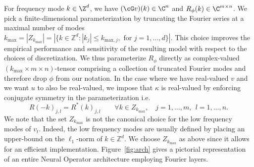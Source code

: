 For frequency mode \(k \in \Z^d\), we have $(\cG v)(k) \in \C^{n}$ and $R_\phi(k) \in \C^{m \times n}$. We pick a finite-dimensional parameterization by truncating the Fourier series at a maximal number of modes 
\(k_{\text{max}} = |Z_{k_{\text{max}}}| = |\{k \in \mathbb{Z}^d : |k_j| \leq k_{\text{max},j}, \text{ for } j=1,\dots,d\}|.\) This choice improves the empirical performance and sensitivity of the resulting model with respect to the choices of discretization.
We thus parameterize $R_\phi$ directly as complex-valued $(k_{\text{max}} \times m \times n)$-tensor comprising a collection of truncated Fourier modes and therefore drop $\phi$ from our notation. 
In the case where we have real-valued  \(v\) and we want \(u\) to also be real-valued, we impose that $\kappa$ is real-valued by enforcing conjugate symmetry in the parameterization i.e.
\[R(-k)_{j,l} = R^*(k)_{j,l} \qquad \forall k \in Z_{k_{\text{max}}}, \quad j=1,\dots,m, \:\: l=1,\dots,n.\]
We note that the set $Z_{k_{\text{max}}}$ is not the canonical choice for the low frequency modes of $v_t$. Indeed, the low frequency modes are usually defined by placing an upper-bound on the $\ell_1$-norm of $k \in \mathbb{Z}^d$. We choose $Z_{k_{\text{max}}}$ as above since it allows for an efficient implementation.  Figure~\ref{fig:arch} gives a pictorial representation of an entire Neural Operator architecture employing Fourier layers.




